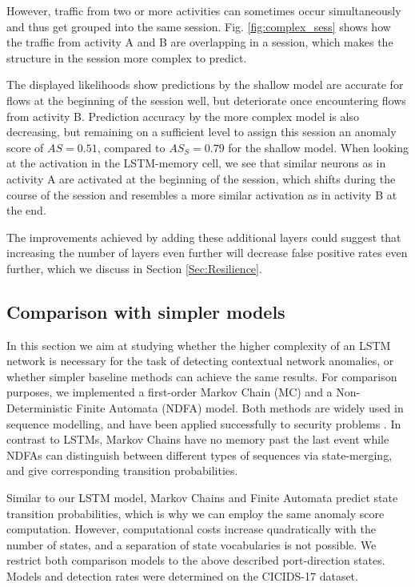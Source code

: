 However, traffic from two or more activities can sometimes occur simultaneously and thus get grouped into the same session. Fig. \ref{fig:complex_sess} shows how the traffic from activity A and B are overlapping in a session, which makes the structure in the session more complex to predict.



The displayed likelihoods show predictions by the shallow model are accurate for flows at the beginning of the session well, but deteriorate once encountering flows from activity B. Prediction accuracy by the more complex model is also decreasing, but remaining on a sufficient level to assign this session an anomaly score of $AS=0.51$, compared to $AS_S=0.79$ for the shallow model. When looking at the activation in the LSTM-memory cell, we see that similar neurons as in activity A are activated at the beginning of the session, which shifts during the course of the session and resembles a more similar activation as in activity B at the end.

The improvements achieved by adding these additional layers could suggest that increasing the number of layers even further will decrease false positive rates even further, which we discuss in Section \ref{Sec:Resilience}.

\subsection{Comparison with simpler models}\label{Sect:Compsimp}

In this section we aim at studying whether the higher complexity of an LSTM network is necessary for the task of detecting contextual network anomalies, or whether simpler baseline methods can achieve the same results. For comparison purposes, we implemented a first-order Markov Chain (MC) and a Non-Deterministic Finite  Automata (NDFA) model. Both methods are widely used in sequence modelling, and have been applied successfully to security problems \cite{ye2000markov,Pellegrino2017}. In contrast to LSTMs, Markov Chains have no memory past the last event while NDFAs can distinguish between different types of sequences via state-merging, and give corresponding transition probabilities.

Similar to our LSTM model, Markov Chains and Finite Automata predict state transition probabilities, which is why we can employ the same anomaly score computation. However, computational costs increase quadratically with the number of states, and a separation of state vocabularies is not possible. We restrict both comparison models to the above described port-direction states. 
Models and detection rates were determined on the CICIDS-17 dataset.

